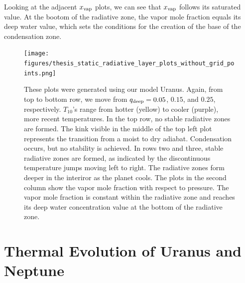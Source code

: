 \documentclass[11pt]{ucscthesisbs}
\begin{document}
Looking at the adjacent $x_{\rm vap}$ plots, we can see that $x_{\rm vap}$ follows its saturated value. At the bootom of the radiative zone, the vapor mole fraction equals its deep water value, which sets the conditions for the creation of the base of the condensation zone. 

\begin{figure}[ht]
 \centerline{
  \texttt{[image: figures/thesis\_static\_radiative\_layer\_plots\_without\_grid\_points.png]}
 }
\caption[Formation of Radiative Zone]
{These plots were generated using our model Uranus. Again, from top to bottom row, we move from $q_{\rm deep} = 0.05$, $0.15$, and $0.25$, respectively. $T_{10}$'s range from hotter (yellow) to cooler (purple), more recent temperatures. In the top row, no stable radiative zones are formed. The kink visible in the middle of the top left plot represents the transition from a moist to dry adiabat. Condensation occurs, but no stability is achieved. In rows two and three, stable radiative zones are formed, as indicated by the discontinuous temperature jumps moving left to right. The radiative zones form deeper in the interiror as the planet cools. The plots in the second column show the vapor mole fraction with respect to pressure. The vapor mole fraction is constant within the radiative zone and reaches its deep water concentration value at the bottom of the radiative zone. }
\label{fig:radiative}
\end{figure}


\section{Thermal Evolution of Uranus and Neptune}
\end{document}
